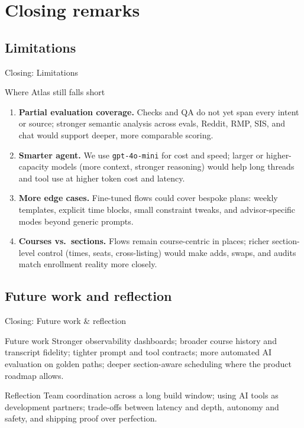 \documentclass[10pt,compress,english]{beamer}
\begin{document}
\section{Closing remarks}

\subsection{Limitations}

\begin{frame}{Closing: Limitations}
  \begin{block}{Where Atlas still falls short}
    \small
    \begin{enumerate}\setlength\itemsep{0.28em}
      \item \textbf{Partial evaluation coverage.} Checks and QA do not yet span every intent or source; stronger semantic analysis across evals, Reddit, RMP, SIS, and chat would support deeper, more comparable scoring.
      \item \textbf{Smarter agent.} We use \texttt{gpt-4o-mini} for cost and speed; larger or higher-capacity models (more context, stronger reasoning) would help long threads and tool use at higher token cost and latency.
      \item \textbf{More edge cases.} Fine-tuned flows could cover bespoke plans: weekly templates, explicit time blocks, small constraint tweaks, and advisor-specific modes beyond generic prompts.
      \item \textbf{Courses vs.\ sections.} Flows remain course-centric in places; richer section-level control (times, seats, cross-listing) would make adds, swaps, and audits match enrollment reality more closely.
    \end{enumerate}
  \end{block}
\end{frame}

\subsection{Future work and reflection}

\begin{frame}{Closing: Future work \& reflection}
  \begin{block}{Future work}
    Stronger observability dashboards; broader course history and transcript fidelity; tighter prompt and tool contracts; more automated AI evaluation on golden paths; deeper section-aware scheduling where the product roadmap allows.
  \end{block}
  \begin{exampleblock}{Reflection}
    Team coordination across a long build window; using AI tools as development partners; trade-offs between latency and depth, autonomy and safety, and shipping proof over perfection.
  \end{exampleblock}
\end{frame}
\end{document}
